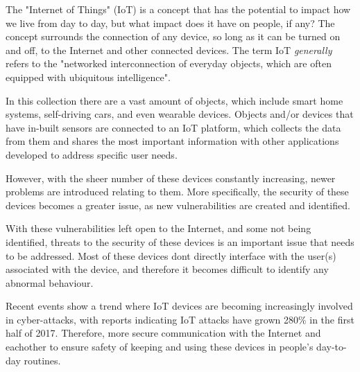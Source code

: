 \raggedright

The "Internet of Things" (IoT) is a concept that has the potential
to impact how we live from day to day, but what impact does it have on people, if any?
The concept surrounds the connection of any device, so long as it can be turned on and off, to the Internet and other connected devices.
The term IoT \textit{generally} refers to the "networked interconnection of everyday objects, which are often equipped with ubiquitous intelligence"\textsuperscript{\cite{vermesan2011internet}}.

\vspace{0.5cm}

In this collection there are a vast amount of objects, which include
smart home systems, self-driving cars, and even wearable devices.
Objects and/or devices that have in-built sensors are connected to an IoT platform, which collects the data from them and shares the most important information with other applications developed to address specific user needs.

However, with the sheer number of these devices constantly increasing,
newer problems are introduced relating to them. More specifically, the security of these devices becomes a greater issue, as new vulnerabilities\textsuperscript{\cite{hole2017analysis}} are created and identified.

\vspace{0.5cm}

With these vulnerabilities left open to the Internet, and some not being identified, threats to the security of these devices is an important issue that needs to be addressed.
Most of these devices dont directly interface with the user(s) associated with the device,
and therefore it becomes difficult to identify any abnormal behaviour.

Recent events show a trend where IoT devices are becoming increasingly involved in cyber-attacks, with reports indicating IoT attacks have grown 280\% in the first half of 2017\textsuperscript{\cite{f5article}}. Therefore, more secure communication with the Internet and eachother to ensure safety of keeping and using these devices in people's day-to-day routines.